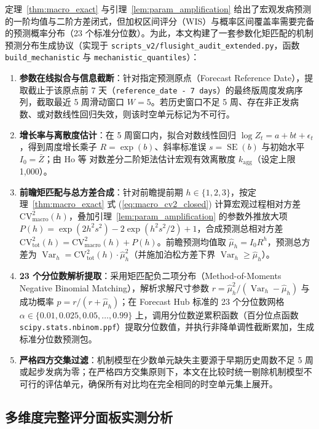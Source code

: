 \documentclass[11pt,a4paper]{article}
\theoremstyle{plain}
\theoremstyle{definition}
\begin{document}
定理~\ref{thm:macro_exact} 与引理~\ref{lem:param_amplification} 给出了宏观发病预测的一阶均值与二阶方差闭式，但加权区间评分（WIS）与概率区间覆盖率需要完备的预测概率分布（23 个标准分位数）。为此，本文构建了一套参数化矩匹配的机制预测分布生成协议（实现于 \texttt{scripts\_v2/flusight\_audit\_extended.py}，函数 \texttt{build\_mechanistic} 与 \texttt{mechanistic\_quantiles}）：
\begin{enumerate}
\item \textbf{参数在线拟合与信息截断}：针对指定预测原点（Forecast Reference Date），提取截止于该原点前 7 天（\texttt{reference\_date - 7 days}）的最终版周度发病序列，截取最近 5 周滑动窗口 $W=5$。若历史窗口不足 5 周、存在非正发病数、或对数线性回归失效，则该时空单元标记为不可行。
\item \textbf{增长率与离散度估计}：在 5 周窗口内，拟合对数线性回归 $\log Z_t = a + bt + \epsilon_t$，得到周度增长乘子 $R = \exp(b)$、斜率标准误 $s = \operatorname{SE}(b)$ 与初始水平 $I_0 = \bar{Z}$；由 Ho 等\citep{ho2023simultaneous} 对数差分二阶矩法估计宏观有效离散度 $k_{\text{agg}}$（设定上限 1,000）。
\item \textbf{前瞻矩匹配与总方差合成}：针对前瞻提前期 $h \in \{1, 2, 3\}$，按定理~\ref{thm:macro_exact} 式 (\ref{eq:macro_cv2_closed}) 计算宏观过程相对方差 $\text{CV}^2_{\text{macro}}(h)$，叠加引理~\ref{lem:param_amplification} 的参数外推放大项 $P(h) = \exp(2h^2s^2) - 2\exp(h^2s^2/2) + 1$，合成预测总相对方差 $\text{CV}^2_{\text{tot}}(h) = \text{CV}^2_{\text{macro}}(h) + P(h)$。前瞻预测均值取 $\hat{\mu}_h = I_0 R^h$，预测总方差为 $\operatorname{Var}_h = \text{CV}^2_{\text{tot}}(h) \cdot \hat{\mu}_h^2$（并施加泊松方差下界 $\operatorname{Var}_h \ge \hat{\mu}_h$）。
\item \textbf{23 个分位数解析提取}：采用矩匹配负二项分布（Method-of-Moments Negative Binomial Matching），解析求解尺寸参数 $r = \hat{\mu}_h^2 / (\operatorname{Var}_h - \hat{\mu}_h)$ 与成功概率 $p = r / (r + \hat{\mu}_h)$；在 Forecast Hub 标准的 23 个分位数网格 $\alpha \in \{0.01, 0.025, 0.05, \dots, 0.99\}$ 上，调用分位数逆累积函数（百分位点函数 \texttt{scipy.stats.nbinom.ppf}）提取分位数值，并执行非降单调性截断累加，生成标准分位数预测包。
\item \textbf{严格四方交集过滤}：机制模型在少数单元缺失主要源于早期历史周数不足 5 周或起步发病为零；在严格四方交集原则下，本文在比较时统一剔除机制模型不可行的评估单元，确保所有对比均在完全相同的时空单元集上展开。
\end{enumerate}

\subsection{多维度完整评分面板实测分析}\label{sec:flusight_scores}
\end{document}
